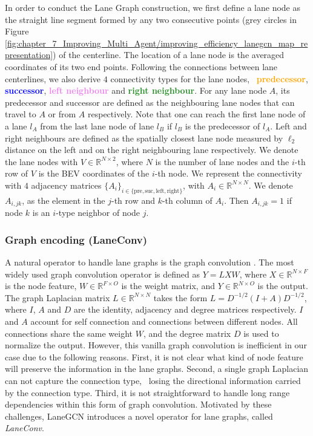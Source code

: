 In order to conduct the Lane Graph construction, we first define a lane node as the straight line segment formed by any two consecutive points (grey circles in Figure \ref{fig:chapter_7_Improving_Multi_Agent/improving_efficiency_lanegcn_map_representation}) of the centerline. The location of a lane node is the averaged coordinates of its two end points. Following the  connections between lane centerlines, we also derive $4$ connectivity types for the lane nodes, \ie \ \textbf{\textcolor{orange}{predecessor}}, \textbf{\textcolor{blue}{successor}}, \textbf{\textcolor{violet}{left neighbour}} and \textbf{\textcolor{ForestGreen}{right neighbour}}. For any lane node $A$, its predecessor and successor are defined as the neighbouring lane nodes that can travel to $A$ or from $A$ respectively. Note that one can reach the first lane node of a lane $l_{A}$ from the last lane node of lane $l_{B}$ if $l_{B}$ is the predecessor of $l_{A}$. Left and right neighbours are defined as the spatially closest lane node measured by $\ell_2$ distance on the left and on the right neighbouring lane respectively. We denote the lane nodes with $V \in \mathbb{R}^{N \times 2}$, where $N$ is the number of lane nodes and the $i$-th row of $V$ is the \ac{BEV} coordinates of the $i$-th node. We represent the connectivity with $4$ adjacency matrices $\{A_i\}_{ i \in \{\text{pre}, \text{suc}, \text{left}, \text{right}\} }$, with $A_i \in \mathbb{R}^{N \times N}$. We denote $A_{i, jk}$, as the element in the $j$-th row and $k$-th column of $A_i$. Then  $A_{i, jk} = 1$ if node $k$ is an $i$-type neighbor of node $j$. 

\subsubsection{Graph encoding (LaneConv)}
\label{subsubsec:7_improving_efficiency_graph_encoding}

A natural operator to handle lane graphs is the graph convolution \cite{shuman2013emerging}.
The most widely used graph convolution operator \cite{kipf2016semi} is defined as $Y = LXW$, where $X \in \mathbb{R}^{N \times F}$ is the node feature, $W \in \mathbb{R}^{F \times O}$ is the weight matrix, and $Y \in \mathbb{R}^{N \times O}$ is the output. The graph Laplacian matrix $L \in \mathbb{R}^{N \times N}$ takes the form $L = D^{-1/2}(I + A)D^{-1/2}$, where $I$, $A$ and $D$ are the identity, adjacency and degree matrices respectively. $I$ and $A$ account for self connection and connections between different nodes. All connections share the same weight $W$, and the degree matrix $D$ is used to normalize the output. However, this vanilla graph convolution is inefficient in our case due to the following reasons. First, it is not clear what kind of node feature will preserve the information in the lane graphs. Second, a single graph Laplacian can not capture the connection type, \ie \ losing the directional information carried by the connection type. Third, it is not straightforward to handle long range dependencies within this form of graph convolution. Motivated by these challenges, LaneGCN \cite{liang2020learning} introduces a novel operator for lane graphs, called \textit{LaneConv}.

